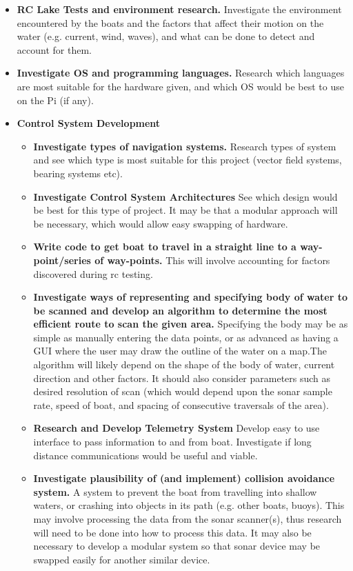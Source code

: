 \documentclass[titlepage 12pt]{article}
\begin{document}
{\begin{itemize}
\item \textbf{RC Lake Tests and environment research.} Investigate the environment encountered by the boats and the factors that affect their motion on the water (e.g. current, wind, waves), and what can be done to detect and account for them.

\item \textbf{Investigate OS and programming languages.} Research which languages are most suitable for the hardware given, and which OS would be best to use on the Pi (if any). 

\item \textbf{Control System Development} 
	\begin{itemize}
	\item \textbf{Investigate types of navigation systems.} Research types of system and see which type is most suitable for this project (vector field systems, bearing systems etc). 
	\item \textbf{Investigate Control System Architectures} See which design would be best for this type of project. It may be that a modular approach will be necessary, which would allow easy swapping of hardware.
	\item \textbf{Write code to get boat to travel in a straight line to a way-point/series of way-points.} This will involve accounting for factors discovered during rc testing.
	\item \textbf{Investigate ways of representing and specifying body of water to be scanned and develop an algorithm to determine the most efficient route to scan the given area.} Specifying the body may be as simple as manually entering the data points, or as advanced as having a GUI where the user may draw the outline of the water on a map.The algorithm will likely depend on the shape of the body of water, current direction and other factors. It should also consider parameters such as desired resolution of scan (which would depend upon the sonar sample rate, speed of boat, and spacing of consecutive traversals of the area).
	\item \textbf{Research and Develop Telemetry System} Develop easy to use interface to pass information to and from boat. Investigate if long distance communications would be useful and viable.
	\item \textbf{Investigate plausibility of (and implement) collision avoidance system.} A system to prevent the boat from travelling into shallow waters, or crashing into objects in its path (e.g. other boats, buoys). This may involve processing the data from the sonar scanner(s), thus research will need to be done into how to process this data. It may also be necessary to develop a modular system so that sonar device may be swapped easily for another similar device.
	\end{itemize}


\end{itemize}}
\end{document}
